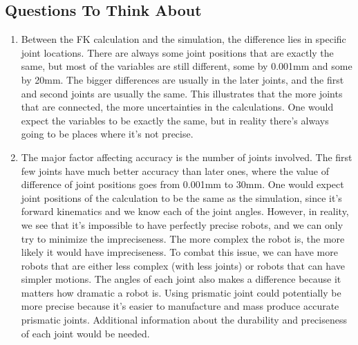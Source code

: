 \documentclass{article}
\begin{document}
\subsection{Questions To Think About} 
\begin{enumerate}
    \item Between the FK calculation and the simulation, the difference lies in specific joint locations. There are always some joint positions that are exactly the same, but most of the variables are still different, some by 0.001mm and some by 20mm. The bigger differences are usually in the later joints, and the first and second joints are usually the same. This illustrates that the more joints that are connected, the more uncertainties in the calculations. One would expect the variables to be exactly the same, but in reality there's always going to be places where it's not precise.
    
    \item The major factor affecting accuracy is the number of joints involved. The first few joints have much better accuracy than later ones, where the value of difference of joint positions goes from 0.001mm to 30mm. One would expect joint positions of the calculation to be the same as the simulation, since it's forward kinematics and we know each of the joint angles. However, in reality, we see that it's impossible to have perfectly precise robots, and we can only try to minimize the impreciseness. The more complex the robot is, the more likely it would have impreciseness. To combat this issue, we can have more robots that are either less complex (with less joints) or robots that can have simpler motions. The angles of each joint also makes a difference because it matters how dramatic a robot is. Using prismatic joint could potentially be more precise because it's easier to manufacture and mass produce accurate prismatic joints. Additional information about the durability and preciseness of each joint would be needed.
\end{enumerate}
\newpage  






\end{document}
